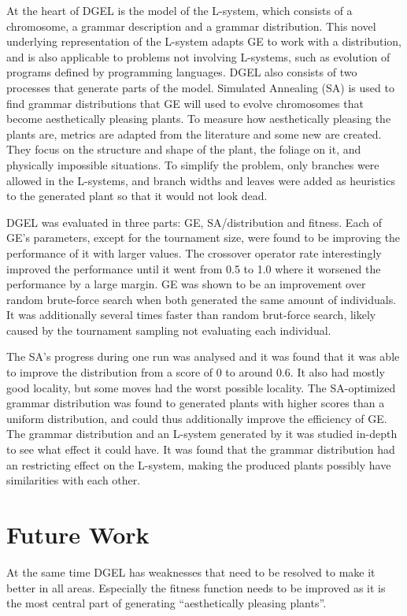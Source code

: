 At the heart of DGEL is the model of the L-system, which consists of a chromosome, a grammar description and a grammar distribution.
This novel underlying representation of the L-system adapts GE to work with a distribution, and is also applicable to problems not involving L-systems, such as evolution of programs defined by programming languages.
DGEL also consists of two processes that generate parts of the model.
Simulated Annealing (SA) is used to find grammar distributions that GE will used to evolve chromosomes that become aesthetically pleasing plants.
To measure how aesthetically pleasing the plants are, metrics are adapted from the literature and some new are created.
They focus on the structure and shape of the plant, the foliage on it, and physically impossible situations.
To simplify the problem, only branches were allowed in the L-systems, and branch widths and leaves were added as heuristics to the generated plant so that it would not look dead.

DGEL was evaluated in three parts: GE, SA/distribution and fitness.
Each of GE's parameters, except for the tournament size, were found to be improving the performance of it with larger values.
The crossover operator rate interestingly improved the performance until it went from 0.5 to 1.0 where it worsened the performance by a large margin.
GE was shown to be an improvement over random brute-force search when both generated the same amount of individuals.
It was additionally several times faster than random brut-force search, likely caused by the tournament sampling not evaluating each individual.

The SA's progress during one run was analysed and it was found that it was able to improve the distribution from a score of 0 to around 0.6.
It also had mostly good locality, but some moves had the worst possible locality.
The SA-optimized grammar distribution was found to generated plants with higher scores than a uniform distribution, and could thus additionally improve the efficiency of GE.
The grammar distribution and an L-system generated by it was studied in-depth to see what effect it could have.
It was found that the grammar distribution had an restricting effect on the L-system, making the produced plants possibly have similarities with each other.


\section{Future Work}
At the same time DGEL has weaknesses that need to be resolved to make it better in all areas.
Especially the fitness function needs to be improved as it is the most central part of generating ``aesthetically pleasing plants''.
